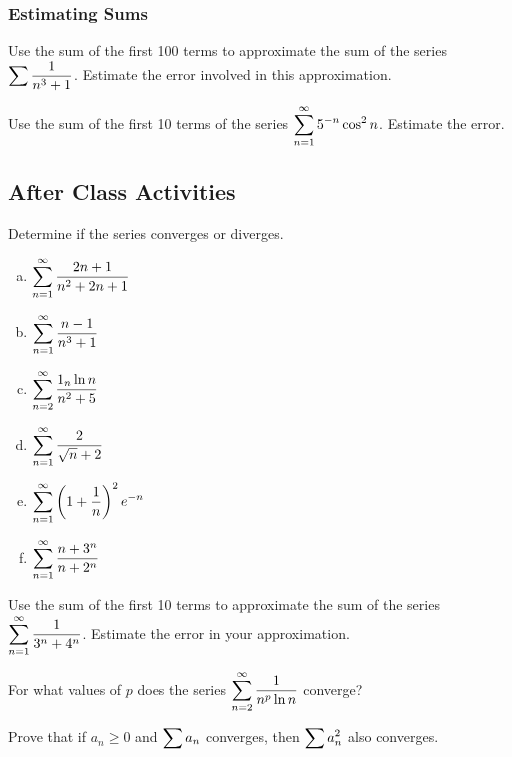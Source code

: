 \documentclass[notes]{subfiles}
\begin{document}
	\subsubsection*{Estimating Sums}
		\begin{ex}
			Use the sum of the first 100 terms to approximate the sum of the series $\displaystyle \sum \dfrac{1}{n^3+1}$.  Estimate the error involved in this approximation.
		\end{ex}
		
		\begin{ex}
			Use the sum of the first 10 terms of the series $\displaystyle \sum_{n = 1}^\infty 5^{-n}\cos^2n$.  Estimate the error.
		\end{ex}
			
			\newpage
	\subsection*{After Class Activities}
		\begin{ex}
			Determine if the series converges or diverges.
			\begin{enumerate}[(a)]
				\item $\displaystyle \sum_{n=1}^\infty \dfrac{2n+1}{n^2+2n+1}$
					
				\item $\displaystyle \sum_{n=1}^\infty \dfrac{n-1}{n^3+1}$
					
				\item $\displaystyle \sum_{n =2}^\infty \dfrac{1_n\ln n}{n^2+5}$
					
				\item $\displaystyle \sum_{n =1}^\infty \dfrac{2}{\sqrt{n} + 2}$
					\newpage
					
				\item $\displaystyle \sum_{n=1}^\infty \left( 1 + \dfrac{1}{n}\right)^2e^{-n}$
				
				\item $\displaystyle \sum_{n=1}^\infty \dfrac{n+3^n}{n+2^n}$
			\end{enumerate}
		\end{ex}
		
		\begin{ex}
			Use the sum of the first 10 terms to approximate the sum of the series $\displaystyle \sum_{n=1}^\infty \dfrac{1}{3^n + 4^n}$. Estimate the error in your approximation.
		\end{ex}
			\vs{1}
			\newpage
			
		\begin{ex}
			For what values of $p$ does the series $\displaystyle\sum_{n=2}^\infty \dfrac{1}{n^p\ln n}$ converge?
		\end{ex}
			
		\begin{ex}
			Prove that if $a_n\geq 0$ and $\displaystyle\sum a_n$ converges, then $\displaystyle\sum a_n^2$ also converges.
		\end{ex}
\clearpage
\end{document}
